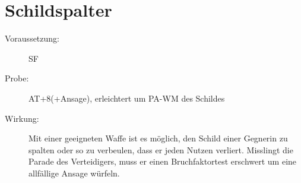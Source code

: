 \section{Schildspalter}
\label{bAT.schildspalter}
\begin{description}
    \item[Voraussetzung:]
        SF 
    \item[Probe:]
        AT+8(+Ansage), erleichtert um PA-WM des Schildes
    \item[Wirkung:]
        Mit einer geeigneten Waffe ist es möglich, den Schild einer Gegnerin zu spalten oder so zu verbeulen, dass er jeden Nutzen verliert.
        Misslingt die Parade des Verteidigers, muss er einen Bruchfaktortest erschwert um eine allfällige Ansage würfeln.
\end{description}
